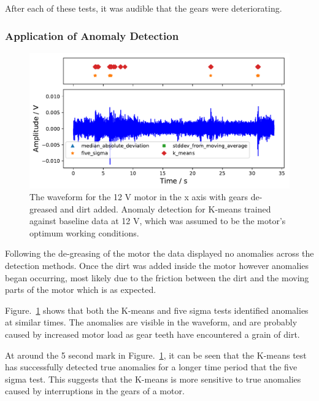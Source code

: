 After each of these tests, it was audible that the gears were deteriorating. 


\subsubsection{Application of Anomaly Detection}

\begin{figure}[t]
    \includegraphics[width=1.0\textwidth]{fig/WD40_dry_dirt_12V_motornorm12V.pdf}
    \caption[Anomaly Tests 12 V Motor with Dirt]{The waveform for the 12 V motor in the x axis with gears de-greased and dirt added. Anomaly detection for K-means trained against baseline data at 12 V, which was assumed to be the motor's optimum working conditions.}
    \label{fig:12V_dirt}
\end{figure}

Following the de-greasing of the motor the data displayed no anomalies across the detection methods. Once the dirt was added inside the motor however anomalies began occurring, most likely due to the friction between the dirt and the moving parts of the motor which is as expected.

Figure.~\ref{fig:12V_dirt} shows that both the K-means and five sigma tests identified anomalies at similar times. The anomalies are visible in the waveform, and are probably caused by increased motor load as gear teeth have encountered a grain of dirt. 

At around the 5 second mark in Figure.~\ref{fig:12V_dirt}, it can be seen that the K-means test has successfully detected true anomalies for a longer time period that the five sigma test. This suggests that the K-means is more sensitive to true anomalies caused by interruptions in the gears of a motor.

